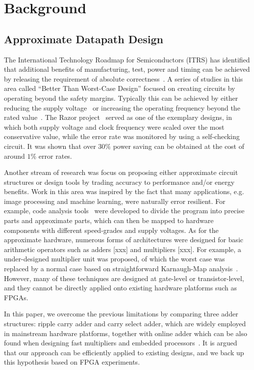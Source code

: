 \documentclass[10pt, conference, compsocconf]{IEEEtran}
\begin{document}
\section{Background}\label{sec:Background}
\subsection{Approximate Datapath Design}
The International Technology Roadmap for Semiconductors (ITRS) has identified that additional benefits of manufacturing, test, power and timing can be achieved by releasing the requirement of absolute correctness~\cite{semiconductor2007international}. A series of studies in this area called ``Better Than Worst-Case Design'' focused on creating circuits by operating beyond the safety margins. Typically this can be achieved by either reducing the supply voltage~\cite{NonUniformScaling} or increasing the operating frequency beyond the rated value~\cite{SKfccm13,JoshFCCM2012}. The Razor project~\cite{Razor2004} served as one of the exemplary designs, in which both supply voltage and clock frequency were scaled over the most conservative value, while the error rate was monitored by using a self-checking circuit. It was shown that over $30\%$ power saving can be obtained at the cost of around $1\%$ error rates.

Another stream of research was focus on proposing either approximate circuit structures or design tools by trading accuracy to performance and/or energy benefits. Work in this area was inspired by the fact that many applications, e.g. image processing and machine learning, were naturally error resilient. For example, code analysis tools~\cite{Truffle2012Uwash,EnerJ2011Uwash} were developed to divide the program into precise parts and approximate parts, which can then be mapped to hardware components with different speed-grades and supply voltages. As for the approximate hardware, numerous forms of architectures were designed for basic arithmetic operators such as adders [xxx] and multipliers [xxx]. For example, a under-designed multiplier unit was proposed, of which the worst case was replaced by a normal case based on straightforward Karnaugh-Map analysis~\cite{Undersigned2x2multiplier}. However, many of these techniques are designed at gate-level or transistor-level, and they cannot be directly applied onto existing hardware platforms such as FPGAs.

In this paper, we overcome the previous limitations by comparing three adder structures: ripple carry adder and carry select adder, which are widely employed in mainstream hardware platforms, together with online adder which can be also found when designing fast multipliers and embedded processors~\cite{RedundantMult_1987}. It is argued that our approach can be efficiently applied to existing designs, and we back up this hypothesis based on FPGA experiments. 
\end{document}
